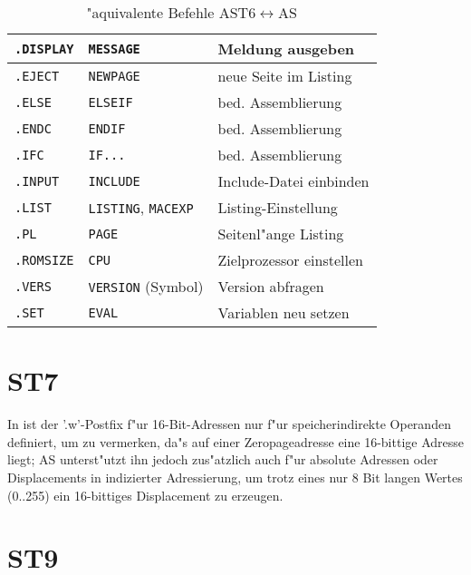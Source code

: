 \documentclass[12pt,a4paper,twoside]{report}
\newcommand{\tty}[1]{{\tt #1}}
\begin{document}
{\begin{table*}[htbp]
\begin{center}
\begin{tabular}{|l|l|l|}
\hline
\hline
\tty{.DISPLAY} &  \tty{MESSAGE}               & Meldung ausgeben \\
\hline
\tty{.EJECT}   &  \tty{NEWPAGE}               & neue Seite im Listing \\
\hline
\tty{.ELSE}    &  \tty{ELSEIF}                & bed. Assemblierung \\
\hline
\tty{.ENDC}    &  \tty{ENDIF}                 & bed. Assemblierung \\
\hline
\tty{.IFC}     &  \tty{IF...}                 & bed. Assemblierung \\
\hline
\tty{.INPUT}   &  \tty{INCLUDE}               & Include-Datei einbinden \\
\hline
\tty{.LIST}    &  \tty{LISTING}, \tty{MACEXP} & Listing-Einstellung \\
\hline
\tty{.PL}      &  \tty{PAGE}                  & Seitenl"ange Listing \\
\hline
\tty{.ROMSIZE} &  \tty{CPU}                   & Zielprozessor einstellen \\
\hline
\tty{.VERS}    &  \tty{VERSION} (Symbol)      & Version abfragen \\
\hline
\tty{.SET}     &  \tty{EVAL}                  & Variablen neu setzen \\
\hline
\end{tabular}\end{center}
\caption{"aquivalente Befehle AST6$\leftrightarrow$AS\label{TabAST6}}
\end{table*}


\section{ST7}

In \cite{ST7Man} ist der '.w'-Postfix f"ur 16-Bit-Adressen nur f"ur
speicherindirekte Operanden definiert, um zu vermerken, da"s auf einer
Zeropageadresse eine 16-bittige Adresse liegt; AS unterst"utzt ihn jedoch
zus"atzlich auch f"ur absolute Adressen oder Displacements in indizierter
Adressierung, um trotz eines nur 8 Bit langen Wertes (0..255) ein
16-bittiges Displacement zu erzeugen.


\section{ST9}

}
\end{document}
